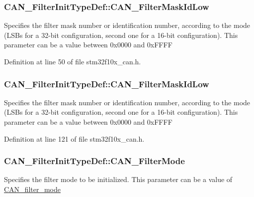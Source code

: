 \subsubsection[{\texorpdfstring{C\+A\+N\+\_\+\+Filter\+Mask\+Id\+Low}{CAN_FilterMaskIdLow}}]{ C\+A\+N\+\_\+\+Filter\+Init\+Type\+Def\+::\+C\+A\+N\+\_\+\+Filter\+Mask\+Id\+Low}\hypertarget{struct_c_a_n___filter_init_type_def_a275d901d0e4aeb5c1a5c3fea976f9b0c}{}\label{struct_c_a_n___filter_init_type_def_a275d901d0e4aeb5c1a5c3fea976f9b0c}
Specifies the filter mask number or identification number, according to the mode (L\+S\+Bs for a 32-\/bit configuration, second one for a 16-\/bit configuration). This parameter can be a value between 0x0000 and 0x\+F\+F\+FF 

Definition at line 50 of file stm32f10x\+\_\+can.\+h.

\subsubsection[{\texorpdfstring{C\+A\+N\+\_\+\+Filter\+Mask\+Id\+Low}{CAN_FilterMaskIdLow}}]{ C\+A\+N\+\_\+\+Filter\+Init\+Type\+Def\+::\+C\+A\+N\+\_\+\+Filter\+Mask\+Id\+Low}\hypertarget{struct_c_a_n___filter_init_type_def_a0f052daf04b0a481ecfa5c2cc8058089}{}\label{struct_c_a_n___filter_init_type_def_a0f052daf04b0a481ecfa5c2cc8058089}
Specifies the filter mask number or identification number, according to the mode (L\+S\+Bs for a 32-\/bit configuration, second one for a 16-\/bit configuration). This parameter can be a value between 0x0000 and 0x\+F\+F\+FF 

Definition at line 121 of file stm32f10x\+\_\+can.\+h.

\subsubsection[{\texorpdfstring{C\+A\+N\+\_\+\+Filter\+Mode}{CAN_FilterMode}}]{ C\+A\+N\+\_\+\+Filter\+Init\+Type\+Def\+::\+C\+A\+N\+\_\+\+Filter\+Mode}\hypertarget{struct_c_a_n___filter_init_type_def_aa1abe2377ba735507df0b1597acedbd9}{}\label{struct_c_a_n___filter_init_type_def_aa1abe2377ba735507df0b1597acedbd9}
Specifies the filter mode to be initialized. This parameter can be a value of \hyperlink{group___c_a_n__filter__mode}{C\+A\+N\+\_\+filter\+\_\+mode} 

